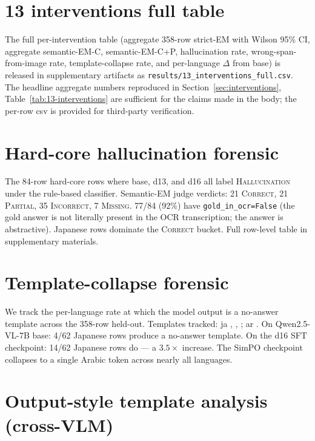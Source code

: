 \section{13 interventions full table}
\label{app:13-interventions}

The full per-intervention table (aggregate 358-row strict-EM with Wilson 95\% CI, aggregate semantic-EM-C, semantic-EM-C+P, hallucination rate, wrong-span-from-image rate, template-collapse rate, and per-language $\Delta$ from base) is released in supplementary artifacts as \texttt{results/13\_interventions\_full.csv}. The headline aggregate numbers reproduced in Section~\ref{sec:interventions}, Table~\ref{tab:13-interventions} are sufficient for the claims made in the body; the per-row csv is provided for third-party verification.

\section{Hard-core hallucination forensic}
\label{app:hardcore}

The 84-row hard-core rows where base, d13, and d16 all label \textsc{Hallucination} under the rule-based classifier. Semantic-EM judge verdicts: 21 \textsc{Correct}, 21 \textsc{Partial}, 35 \textsc{Incorrect}, 7 \textsc{Missing}. 77/84 (92\%) have \texttt{gold\_in\_ocr=False} (the gold answer is not literally present in the OCR transcription; the answer is abstractive). Japanese rows dominate the \textsc{Correct} bucket. Full row-level table in supplementary materials.

\section{Template-collapse forensic}
\label{app:templates}

We track the per-language rate at which the model output is a no-answer template across the 358-row held-out. Templates tracked: ja \jatemplate{}, \jatemplatealt{}, \jaunknown{}; ar \artemplate. On Qwen2.5-VL-7B base: 4/62 Japanese rows produce a no-answer template. On the d16 SFT checkpoint: 14/62 Japanese rows do --- a $3.5\times$ increase. The SimPO checkpoint collapses to a single Arabic \artemplate{} token across nearly all languages.

\section{Output-style template analysis (cross-VLM)}
\label{app:style-templates}

